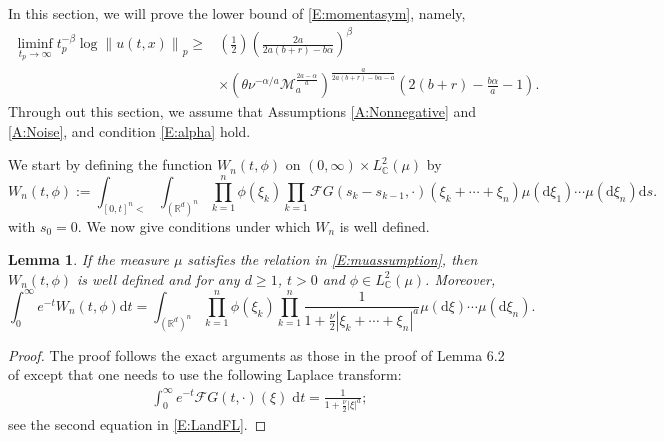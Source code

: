 \documentclass[12pt]{report}
\theoremstyle{plain}
\newtheorem{lemma}[theorem]{Lemma}
\theoremstyle{definition}
\numberwithin{equation}{section}
\newcommand{\R}{\mathbb{R}}
\newcommand{\Norm}[1]{\left\|  #1   \right\|}
\newcommand{\ud}{\ensuremath{ \mathrm{d} }}
\begin{document}
In this section, we will prove the lower bound of \eqref{E:momentasym}, namely,
\begin{equation} \label{E:momentasym-lower}
\begin{aligned}
\liminf_{t_p \to \infty} t_p^{-\beta} \log \Norm{u(t,x)}_p \ge
& \left(\frac{1}{2}\right)\left(\frac{2a}{2a(b+r)- b\alpha} \right)^\beta \\
& \times \left(\theta\nu^{-\alpha/a} \mathcal{M}_a^{\frac{2a-\alpha}{a}}\right)^{\frac{a}{2a(b+r)-b\alpha-a}}\left(2(b+r)-\frac{b\alpha}{a}-1\right).
\end{aligned}
\end{equation}
Through out this section, we assume that Assumptions \ref{A:Nonnegative} and \ref{A:Noise}, and
condition \eqref{E:alpha} hold.

We start by defining the function $W_n(t,\phi)$ on $(0,\infty) \times L_{\mathbb{C}}^2(\mu)$ by
\begin{equation}
W_n(t,\phi) := \int_{[0,t]^n<}
\int_{(\R^d)^n} \prod_{k=1}^n \phi(\xi_k) \prod_{k=1}\mathcal{F}G(s_k-s_{k-1},\cdot)(\xi_k + \cdots + \xi_n) \mu(\ud \xi_1)\cdots \mu(\ud \xi_n) \ud s.
\end{equation}
with $s_0=0$. We now give conditions under which $W_n$ is well defined.

\begin{lemma} \label{L:LWn}
	If the measure $\mu$ satisfies the relation in \eqref{E:muassumption}, then $W_n(t,\phi)$ is well
	defined and for any $d \ge 1$, $t>0$ and $\phi \in L^2_{\mathbb{C}}(\mu)$. Moreover,
	\begin{equation}
	\label{E:LWn}
	\int_0^\infty e^{-t}W_n(t,\phi) \ud t
	= \int_{(\R^d)^n} \prod_{k=1}^n \phi(\xi_k) \prod_{k=1}^n \frac{1}{1+\frac{\nu}{2}|\xi_k + \cdots + \xi_n|^a} \mu(\ud \xi) \cdots \mu(\ud \xi_n).
	\end{equation}
\end{lemma}
\begin{proof}
	The proof follows the exact arguments as those in the proof of Lemma 6.2 of \cite{balan.chen.ea:22:exact} except
	that one needs to use the following Laplace transform:
	\begin{align*}
	\int_0^\infty e^{-t} \mathcal{F}G(t,\cdot)(\xi) \; \ud t =\frac{1}{1+\frac{\nu}{2}|\xi|^a};
	\end{align*}
	see the second equation in \eqref{E:LandFL}.
\end{proof}
\end{document}
